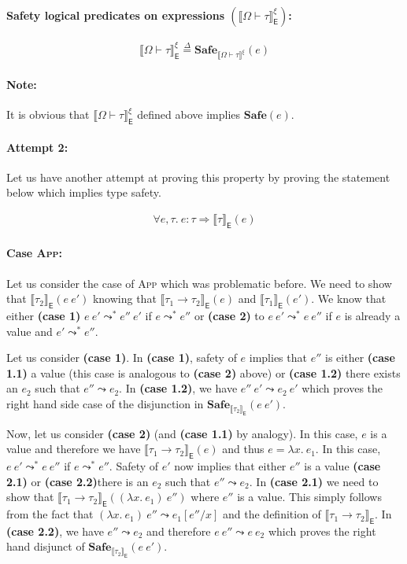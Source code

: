\documentclass{article}
\newcommand{\EXP}{\mathsf{E}}
\newcommand{\defeq}{\overset{\Delta}{=}}
\newcommand{\semtyp}[2]{\llbracket #2 \rrbracket_{#1}}
\begin{document}
\paragraph{Safety logical predicates on expressions $\left(\semtyp{\EXP}{\Omega \vdash \tau}^{\xi}\right)$:}
\[
\semtyp{\EXP}{\Omega \vdash \tau}^{\xi} \defeq \mathbf{Safe}_{\semtyp{}{\Omega \vdash \tau}^{\xi}}(e)
\]

\paragraph{Note:} It is obvious that $\semtyp{\EXP}{\Omega \vdash \tau}^{\xi}$
defined above implies $\mathbf{Safe}(e)$.

\paragraph{Attempt 2:} Let us have another attempt at proving this property by proving
the statement below which implies type safety.

\begin{align*}
\label{secatt}
\forall e, \tau.~e : \tau \Rightarrow \semtyp{\EXP}{\tau}(e)
\end{align*}

\paragraph{Case \textsc{App}:}
Let us consider the case of \textsc{App} which was problematic before.
We need to show that $\semtyp{\EXP}{\tau_2}(e~e')$ knowing that
$\semtyp{\EXP}{\tau_1 \to \tau_2}(e)$ and $\semtyp{\EXP}{\tau_1}(e')$.
We know that either \textbf{(case 1)} $e~e' \leadsto^* e''~e'$ if $e \leadsto^* e''$
or \textbf{(case 2)} to $e~e' \leadsto^* e~e''$ if $e$ is already a value and $e' \leadsto^* e''$.

Let us consider \textbf{(case 1)}.
In \textbf{(case 1)}, safety of $e$ implies that $e''$ is either \textbf{(case 1.1)} a value (this case is analogous to \textbf{(case 2)} above) or \textbf{(case 1.2)} there exists an $e_2$ such that $e'' \leadsto e_2$. In \textbf{(case 1.2)}, we have $e''~e' \leadsto e_2~e'$ which proves
the right hand side case of the disjunction in $\mathbf{Safe}_{\semtyp{\EXP}{\tau_2}}(e~e')$.

Now, let us consider \textbf{(case 2)} (and \textbf{(case 1.1)} by analogy). In this case, $e$ is
a value and therefore we have $\semtyp{\EXP}{\tau_1 \to \tau_2}(e)$ and thus $e = \lambda x.~e_1$.
In this case, $e~e' \leadsto^* e~e''$ if $e \leadsto^* e''$. Safety of $e'$ now implies that
either $e''$ is a value \textbf{(case 2.1)} or \textbf{(case 2.2)}there is an $e_2$ such that
$e'' \leadsto e_2$.
In \textbf{(case 2.1)} we need to show that $\semtyp{\EXP}{\tau_1 \to \tau_2}((\lambda x.~e_1)~e'')$ where $e''$ is a value. This simply follows from the fact that $(\lambda x.~e_1)~e'' \leadsto e_1[e''/x]$ and the definition of $\semtyp{\EXP}{\tau_1 \to \tau_2}$.
In \textbf{(case 2.2)}, we have $e'' \leadsto e_2$ and therefore $e~e'' \leadsto e~e_2$ which
proves the right hand disjunct of $\mathbf{Safe}_{\semtyp{\EXP}{\tau_2}}(e~e')$.
\end{document}
